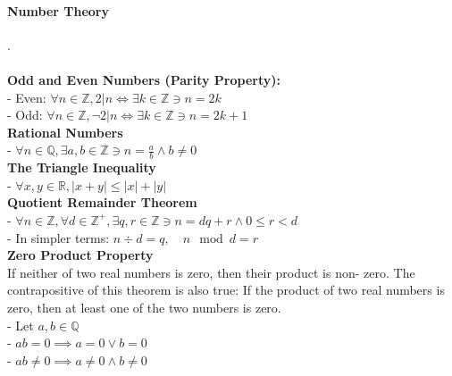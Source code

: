 \documentclass[10pt,letterpaper]{article}
\begin{document}
\newpage

\begin{multicols}{2}

\paragraph*{Number Theory}.\\\\
\textbf{Odd and Even Numbers (Parity Property):}\\
- Even: $\forall n \in \mathbb{Z}, 2|n \iff \exists k \in \mathbb{Z} \ni n = 2k$\\
- Odd: $\forall n \in \mathbb{Z}, \neg{2|n} \iff \exists k \in \mathbb{Z} \ni n = 2k + 1$\\
\textbf{Rational Numbers}\\
- $\forall n \in \mathbb{Q}, \exists a,b \in \mathbb{Z} \ni n = \frac{a}{b} \land b \neq 0$\\
\textbf{The Triangle Inequality}\\
- $\forall x,y \in \mathbb{R}, |x+y| \leq |x| + |y|$\\
\textbf{Quotient Remainder Theorem}\\
- $\forall n \in \mathbb{Z}, \forall d \in \mathbb{Z}^+, \exists q, r \in \mathbb{Z} \ni n = dq + r \land 0 \leq r < d$\\
- In simpler terms: $n \div d = q, \quad n \mod d = r$\\
\textbf{Zero Product Property}\\
If neither of two real numbers is zero, then their product is non-
zero. The contrapositive of this theorem is also true: If the product of two
real numbers is zero, then at least one of the two numbers is zero.\\
- Let $a,b \in \mathbb{Q}$\\
- $ab = 0 \implies a = 0 \lor b = 0$\\
- $ab \neq 0 \implies a \neq 0 \land b \neq 0$


\end{multicols}
\end{document}
